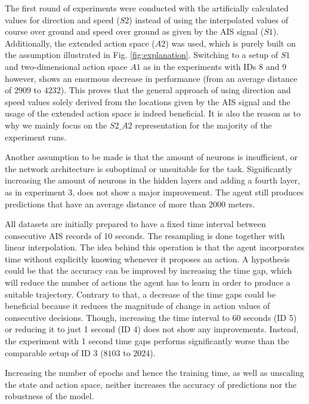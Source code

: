 The first round of experiments were conducted with the artificially calculated values for direction and speed ($S2$) instead of using the interpolated values of course over ground and speed over ground as given by the AIS signal ($S1$). Additionally, the extended action space ($A2$) was used, which is purely built on the assumption illustrated in Fig. \ref{fig:explanation}. Switching to a setup of $S1$ and two-dimensional action space $A1$ as in the experiments with IDs 8 and 9 however, shows an enormous decrease in performance (from an average distance of $2909$ to $4232$). This proves that the general approach of using direction and speed values solely derived from the locations given by the AIS signal and the usage of the extended action space is indeed beneficial. It is also the reason as to why we mainly focus on the $S2\_A2$ representation for the majority of the experiment runs.
\par
Another assumption to be made is that the amount of neurons is insufficient, or the network architecture is suboptimal or unsuitable for the task. Significantly increasing the amount of neurons in the hidden layers and adding a fourth layer, as in experiment 3, does not show a major improvement. The agent still produces predictions that have an average distance of more than 2000 meters.
\par
All datasets are initially prepared to have a fixed time interval between consecutive AIS records of 10 seconds. The resampling is done together with linear interpolation. The idea behind this operation is that the agent incorporates time without explicitly knowing whenever it proposes an action. A hypothesis could be that the accuracy can be improved by increasing the time gap, which will reduce the number of actions the agent has to learn in order to produce a suitable trajectory. Contrary to that, a decrease of the time gaps could be beneficial because it reduces the magnitude of change in action values of consecutive decisions. Though, increasing the time interval to 60 seconds (ID 5) or reducing it to just 1 second (ID 4) does not show any improvements. Instead, the experiment with 1 second time gaps performs significantly worse than the comparable setup of ID 3 ($8103$ to $2024$).
\par
Increasing the number of epochs and hence the training time, as well as unscaling the state and action space, neither increases the accuracy of predictions nor the robustness of the model.
\par

